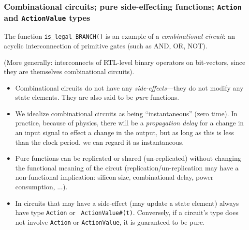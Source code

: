 
\begin{frame}[fragile]
\frametitle{Combinational circuits; pure {\vs} side-effecting functions; {\tt Action} and {\tt ActionValue} types}

\footnotesize

The function {\tt is\_legal\_BRANCH()} is an example of a
\emph{combinational circuit}: an acyclic interconnection of primitive
gates (such as AND, OR, NOT).

\vspace{1ex}

(More generally: interconnects of RTL-level binary operators on
bit-vectors, since they are themselves combinational circuits).

\vfill

\begin{itemize}

 \item Combinational circuits do not have any
       \emph{side-effects}---they do not modify any state elements.
       They are also said to be \emph{pure} functions.

 \item We idealize combinational circuits as being ``instantaneous''
       (zero time).  In practice, because of physics, there will be a
       \emph{propagation delay} for a change in an input signal to
       effect a change in the output, but as long as this is less than
       the clock period, we can regard it as instantaneous.

 \item Pure functions can be replicated or shared (un-replicated)
       without changing the functional meaning of the circut
       (replication/un-replication may have a non-functional
       implication: silicon size, combinational delay, power
       consumption, ...).

 \item In {\BSV} circuits that may have a side-effect (may update a
       state element) always have type {\tt Action} or {\tt
       ActionValue\#(t)}.  Conversely, if a circuit's type does not
       involve {\tt Action} or {\tt ActionValue}, it is guaranteed to
       be pure.

\end{itemize}

\end{frame}


